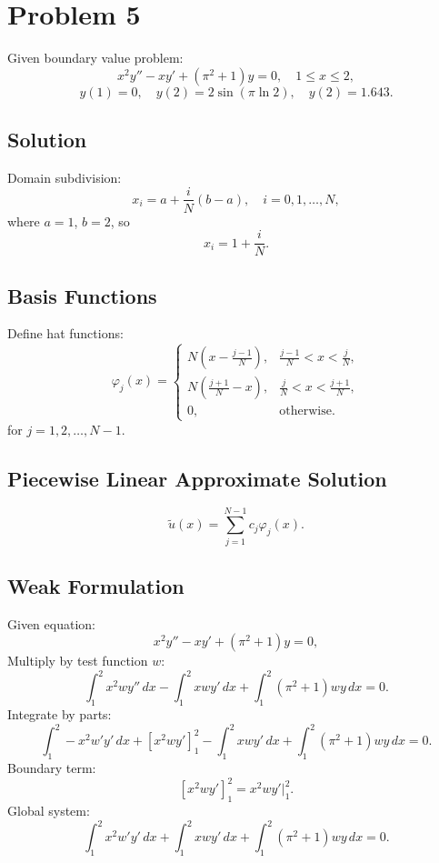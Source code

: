 \documentclass{article}
\begin{document}
\newpage

\section*{Problem 5}

Given boundary value problem:
\[
x^2 y'' - x y' + (\pi^2 + 1)y = 0, \quad 1 \leq x \leq 2,
\]
\[
y(1) = 0, \quad y(2) = 2 \sin(\pi \ln 2), \quad y(2) = 1.643.
\]

\subsection*{Solution}

Domain subdivision:
\[
x_i = a + \frac{i}{N} (b - a), \quad i = 0, 1, \dots, N,
\]
where $a = 1$, $b = 2$, so
\[
x_i = 1 + \frac{i}{N}.
\]

\subsection*{Basis Functions}

Define hat functions:
\[
\varphi_j (x) =
\begin{cases}
N \left( x - \frac{j-1}{N} \right), & \frac{j-1}{N} < x < \frac{j}{N}, \\
N \left( \frac{j+1}{N} - x \right), & \frac{j}{N} < x < \frac{j+1}{N}, \\
0, & \text{otherwise}.
\end{cases}
\]
for $j = 1, 2, \dots, N-1$.

\subsection*{Piecewise Linear Approximate Solution}

\[
\tilde{u}(x) = \sum_{j=1}^{N-1} c_j \varphi_j(x).
\]

\subsection*{Weak Formulation}

Given equation:
\[
x^2 y'' - x y' + (\pi^2 + 1)y = 0,
\]
Multiply by test function $w$:
\[
\int_1^2 x^2 w y'' \, dx - \int_1^2 x w y' \, dx + \int_1^2 (\pi^2 + 1) w y \, dx = 0.
\]
Integrate by parts:
\[
\int_1^2 -x^2 w' y' \, dx + \left[ x^2 w y' \right]_1^2 - \int_1^2 x w y' \, dx + \int_1^2 (\pi^2 + 1) w y \, dx = 0.
\]
Boundary term:
\[
\left[ x^2 w y' \right]_1^2 = x^2 w y' \bigg|_1^2.
\]
Global system:
\[
\int_1^2 x^2 w' y' \, dx + \int_1^2 x w y' \, dx + \int_1^2 (\pi^2 + 1) w y \, dx = 0.
\]
\end{document}
